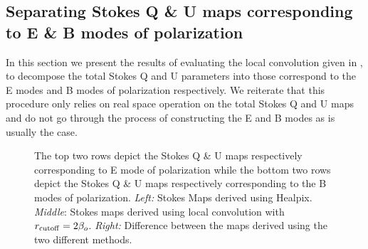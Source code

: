\subsection{Separating Stokes Q \& U maps corresponding to E \& B modes of polarization}
In this section we present the results of evaluating the local convolution given in , to decompose the total Stokes Q and U parameters into those correspond to the E modes and B modes of polarization respectively. We reiterate that this procedure only relies on real space operation on the total Stokes Q and U maps and do not go through the process of constructing the E and B modes as is usually the case.
%
\begin{figure}[!t] 
\centering
{}

\caption{The top two rows depict the Stokes Q \& U maps  respectively corresponding to E mode of polarization while the bottom two rows depict  the Stokes Q \& U maps  respectively corresponding to the  B modes of polarization. \textit{Left:} Stokes Maps derived using Healpix. \textit{Middle}: Stokes maps derived using local convolution with $r_{\rm cutoff} = 2 \beta_o$. \textit{Right:} Difference between the maps derived using the two different methods.}
\label{fig:equ-bqu-maps-compare}
\end{figure}
%

